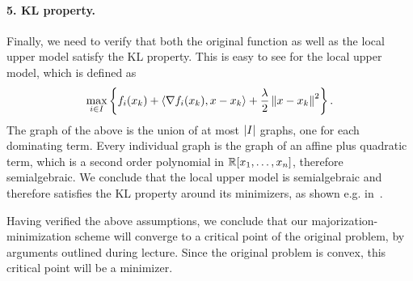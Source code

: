 \documentclass[10pt]{article}
\begin{document}
\begin{Answer}
    \paragraph{5. KL property.}
    Finally, we need to verify that both the original function as well as the
    local upper model satisfy the KL property. This is easy to see for the
    local upper model, which is defined as
    \[
        \max_{i \in I} \left\{ f_i(x_k) + \left\langle \nabla f_i(x_k), x - x_k \right\rangle
        + \frac{\lambda}{2} \left \|  x - x_k \right \|^2 \right\}.
    \]
    The graph of the above is the union of at most $\left| I \right|$ graphs, one for
    each dominating term. Every individual graph is the graph of an affine plus
    quadratic term, which is a second order polynomial in $\mathbb{R}[x_1, \dots,
    x_n]$, therefore semialgebraic. We conclude that the local upper model
    is semialgebraic and therefore satisfies the KL property around its
    minimizers, as shown e.g. in~\cite{BolDanLew07}.

    Having verified the above assumptions, we conclude that our
    majorization-minimization scheme will converge to a critical point of the
    original problem, by arguments outlined during lecture. Since the original
    problem is convex, this critical point will be a minimizer.
\end{Answer}
\end{document}

